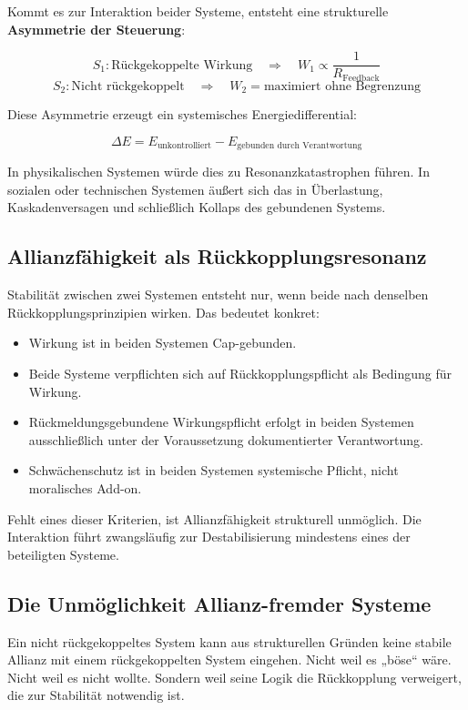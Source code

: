 \documentclass[12pt,a4paper]{article}
\begin{document}
Kommt es zur Interaktion beider Systeme, entsteht eine strukturelle \textbf{Asymmetrie der Steuerung}:

\[
S_1 : \text{Rückgekoppelte Wirkung} \quad \Rightarrow \quad W_1 \propto \frac{1}{R_{\text{Feedback}}}
\]
\[
S_2 : \text{Nicht rückgekoppelt} \quad \Rightarrow \quad W_2 = \text{maximiert ohne Begrenzung}
\]

Diese Asymmetrie erzeugt ein systemisches Energiedifferential:

\[
\Delta E = E_{\text{unkontrolliert}} - E_{\text{gebunden durch Verantwortung}}
\]

In physikalischen Systemen würde dies zu Resonanzkatastrophen führen. In sozialen oder technischen Systemen äußert sich das in Überlastung, Kaskadenversagen und schließlich Kollaps des gebundenen Systems.

\subsection{Allianzfähigkeit als Rückkopplungsresonanz}

Stabilität zwischen zwei Systemen entsteht nur, wenn beide nach denselben Rückkopplungsprinzipien wirken.  
Das bedeutet konkret:

\begin{itemize}
    \item Wirkung ist in beiden Systemen Cap-gebunden.
    \item Beide Systeme verpflichten sich auf Rückkopplungspflicht als Bedingung für Wirkung.
    \item Rückmeldungsgebundene Wirkungspflicht erfolgt in beiden Systemen ausschließlich unter der Voraussetzung dokumentierter Verantwortung.
    \item Schwächenschutz ist in beiden Systemen systemische Pflicht, nicht moralisches Add-on.
\end{itemize}

Fehlt eines dieser Kriterien, ist Allianzfähigkeit strukturell unmöglich.  
Die Interaktion führt zwangsläufig zur Destabilisierung mindestens eines der beteiligten Systeme.

\subsection{Die Unmöglichkeit Allianz-fremder Systeme}

Ein nicht rückgekoppeltes System kann aus strukturellen Gründen keine stabile Allianz mit einem rückgekoppelten System eingehen.  
Nicht weil es „böse“ wäre. Nicht weil es nicht wollte. Sondern weil seine Logik die Rückkopplung verweigert, die zur Stabilität notwendig ist.
\end{document}
